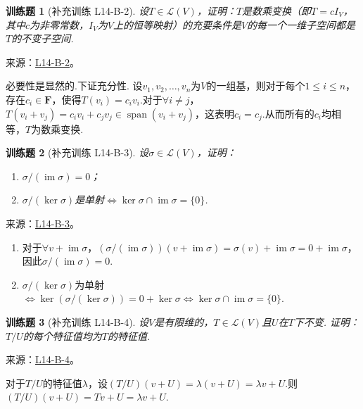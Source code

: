 \documentclass[12pt,fontset=fandol]{ctexart}
\newtheorem{exercise}{训练题}[section]
\begin{document}
\begin{exercise}[补充训练 L14-B-2]\label{prob:L14-B-2}
设$T\in \mathcal{L}(V)$，证明：$T$是数乘变换（即$T=cI_V$，其中$c$为非零常数，$I_V$为$V$上的恒等映射）的充要条件是$V$的每一个一维子空间都是$T$的不变子空间.
\end{exercise}
\noindent 来源：\href{https://github.com/yhwu-is/Linear-Algebra-Left-Undone/blob/new/%E8%AE%B2%E4%B9%89/%E4%B8%93%E9%A2%98/14%20%E7%9B%B8%E4%BC%BC%E6%A0%87%E5%87%86%E5%BD%A2%EF%BC%9A%E5%8A%A8%E6%9C%BA%E4%B8%8E%E5%9F%BA%E7%A1%80.tex}{L14-B-2}。
\begin{solve}
必要性是显然的.下证充分性.
            设$v_1,v_2,\ldots,v_n$为$V$的一组基，则对于每个$1\leqslant i \leqslant n$，存在$c_i\in \mathbf{F}$，使得$T(v_i)=c_iv_i$.对于$\forall i\neq j$，$T(v_i+v_j)=c_iv_i+c_jv_j\in \operatorname{span}(v_i+v_j)$，这表明$c_i=c_j$.从而所有的$c_i$均相等，$T$为数乘变换.
\end{solve}

\begin{exercise}[补充训练 L14-B-3]\label{prob:L14-B-3}
设$\sigma\in \mathcal{L}(V)$，证明：
        \begin{enumerate}
            \item $\sigma/(\operatorname{im} \sigma)=0$；

            \item $\sigma/(\ker \sigma)$是单射$\iff \ker \sigma\cap\operatorname{im} \sigma=\{0\}$.
        \end{enumerate}
\end{exercise}
\noindent 来源：\href{https://github.com/yhwu-is/Linear-Algebra-Left-Undone/blob/new/%E8%AE%B2%E4%B9%89/%E4%B8%93%E9%A2%98/14%20%E7%9B%B8%E4%BC%BC%E6%A0%87%E5%87%86%E5%BD%A2%EF%BC%9A%E5%8A%A8%E6%9C%BA%E4%B8%8E%E5%9F%BA%E7%A1%80.tex}{L14-B-3}。
\begin{solve}
\begin{enumerate}
                \item 对于$\forall v+\operatorname{im}\sigma$，$(\sigma/(\operatorname{im}\sigma))(v+\operatorname{im}\sigma)=\sigma(v)+\operatorname{im}\sigma=0+\operatorname{im}\sigma$，因此$\sigma/(\operatorname{im}\sigma)=0$.
                \item $\sigma/(\ker\sigma)$为单射$\iff \ker(\sigma/(\ker\sigma))=0+\ker\sigma\iff \ker\sigma\cap\operatorname{im}\sigma=\{0\}$.
            \end{enumerate}
\end{solve}

\begin{exercise}[补充训练 L14-B-4]\label{prob:L14-B-4}
设$V$是有限维的，$T\in \mathcal{L}(V)$且$U$在$T$下不变. 证明：$T/U$的每个特征值均为$T$的特征值.
\end{exercise}
\noindent 来源：\href{https://github.com/yhwu-is/Linear-Algebra-Left-Undone/blob/new/%E8%AE%B2%E4%B9%89/%E4%B8%93%E9%A2%98/14%20%E7%9B%B8%E4%BC%BC%E6%A0%87%E5%87%86%E5%BD%A2%EF%BC%9A%E5%8A%A8%E6%9C%BA%E4%B8%8E%E5%9F%BA%E7%A1%80.tex}{L14-B-4}。
\begin{solve}
对于$T/U$的特征值$\lambda$，设$(T/U)(v+U)=\lambda(v+U)=\lambda v+U$.则$(T/U)(v+U)=Tv+U=\lambda v+U$.
\end{solve}
\end{document}
